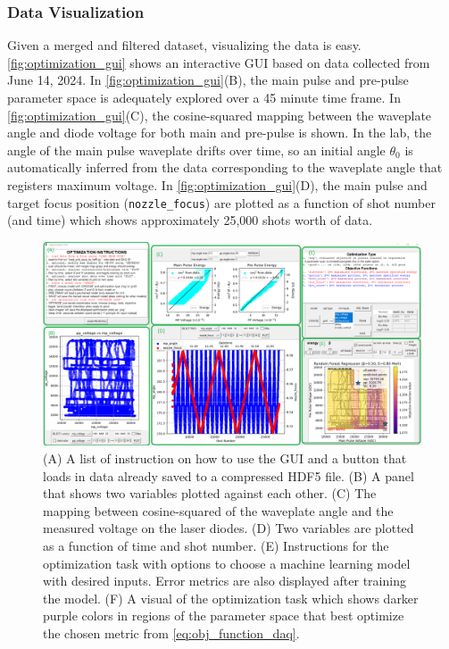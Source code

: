 \subsubsection{Data Visualization}
Given a merged and filtered dataset, visualizing the data is easy. \autoref{fig:optimization_gui} shows an interactive \gls{GUI} based on data collected from June 14, 2024. In \autoref{fig:optimization_gui}(B), the main pulse and pre-pulse parameter space is adequately explored over a 45 minute time frame. In \autoref{fig:optimization_gui}(C), the cosine-squared mapping between the waveplate angle and diode voltage for both main and pre-pulse is shown. In the lab, the angle of the main pulse waveplate drifts over time, so an initial angle $\theta_0$ is automatically inferred from the data corresponding to the waveplate angle that registers maximum voltage. In \autoref{fig:optimization_gui}(D), the main pulse and target focus position (\texttt{nozzle\_focus}) are plotted as a function of shot number (and time) which shows approximately 25,000 shots worth of data.

\begin{figure}
	\centering 
	\includegraphics[width=\linewidth]{planning/images/daq/optimization_gui.png}
	\caption{(A) A list of instruction on how to use the GUI and a button that loads in data already saved to a compressed HDF5 file. (B) A panel that shows two variables plotted against each other. (C) The mapping between cosine-squared of the waveplate angle and the measured voltage on the laser diodes. (D) Two variables are plotted as a function of time and shot number. (E) Instructions for the optimization task with options to choose a machine learning model with desired inputs. Error metrics are also displayed after training the model. (F) A visual of the optimization task which shows darker purple colors in regions of the parameter space that best optimize the chosen metric from \autoref{eq:obj_function_daq}.}
	\label{fig:optimization_gui}
\end{figure}

